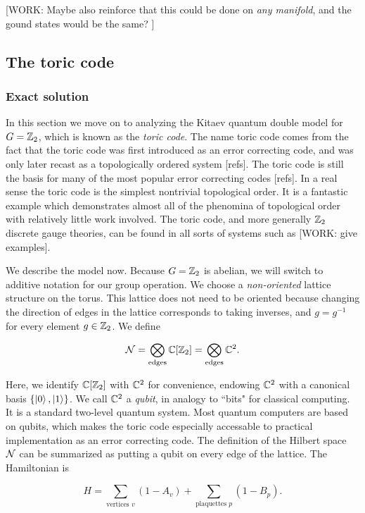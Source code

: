 [WORK: Maybe also reinforce that this could be done on \textit{any manifold}, and the gound states would be the same? ]

\subsection{The toric code}

\subsubsection{Exact solution}

In this section we move on to analyzing the Kitaev quantum double model for $G=\mathbb{Z}_2$, which is known as the \textit{toric code}. The name toric code comes from the fact that the toric code was first introduced as an error correcting code, and was only later recast as a topologically ordered system [refs]. The toric code is still the basis for many of the most popular error correcting codes [refs]. In a real sense the toric code is the simplest nontrivial topological order. It is a fantastic example which demonstrates almost all of the phenomina of topological order with relatively little work involved. The toric code, and more generally $\mathbb{Z}_2$ discrete gauge theories, can be found in all sorts of systems such as [WORK: give examples]. 

We describe the model now. Because $G=\mathbb{Z}_2$ is abelian, we will switch to additive notation for our group operation. We choose a \textit{non-oriented} lattice structure on the torus. This lattice does not need to be oriented because changing the direction of edges in the lattice corresponds to taking inverses, and $g=g^{-1}$ for every element $g\in \mathbb{Z}_2$. We define

$$\mathcal{N} = \bigotimes_{\text{edges}}\mathbb{C}[\mathbb{Z}_2]=\bigotimes_{\text{edges}}\mathbb{C}^2.$$

Here, we identify $\mathbb{C}[\mathbb{Z}_2]$ with $\mathbb{C}^2$ for convenience, endowing $\mathbb{C}^2$ with a canonical basis $\{\ket{0},\ket{1}\}$. We call $\mathbb{C}^2$ a \textit{qubit}, in analogy to ``bits" for classical computing. It is a standard two-level quantum system. Most quantum computers are based on qubits, which makes the toric code especially accessable to practical implementation as an error correcting code. The definition of the Hilbert space $\mathcal{N}$ can be summarized as putting a qubit on every edge of the lattice. The Hamiltonian is

$$H=\sum_{\text{vertices }v}(1-A_v)+\sum_{\text{plaquettes }p}(1-B_p).$$

